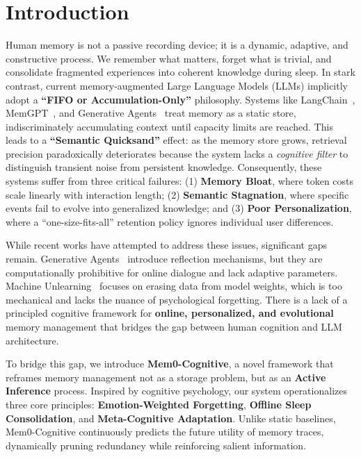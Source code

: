 \section{Introduction}
\label{sec:introduction}

Human memory is not a passive recording device; it is a dynamic, adaptive, and constructive process. We remember what matters, forget what is trivial, and consolidate fragmented experiences into coherent knowledge during sleep. In stark contrast, current memory-augmented Large Language Models (LLMs) implicitly adopt a \textbf{``FIFO or Accumulation-Only''} philosophy. Systems like LangChain~\cite{langchain}, MemGPT~\cite{memgpt}, and Generative Agents~\cite{generative_agents} treat memory as a static store, indiscriminately accumulating context until capacity limits are reached. This leads to a \textbf{``Semantic Quicksand''} effect: as the memory store grows, retrieval precision paradoxically deteriorates because the system lacks a \textit{cognitive filter} to distinguish transient noise from persistent knowledge. Consequently, these systems suffer from three critical failures: (1) \textbf{Memory Bloat}, where token costs scale linearly with interaction length; (2) \textbf{Semantic Stagnation}, where specific events fail to evolve into generalized knowledge; and (3) \textbf{Poor Personalization}, where a ``one-size-fits-all'' retention policy ignores individual user differences.

While recent works have attempted to address these issues, significant gaps remain. Generative Agents~\cite{generative_agents} introduce reflection mechanisms, but they are computationally prohibitive for online dialogue and lack adaptive parameters. Machine Unlearning~\cite{sekhar2021unlearning} focuses on erasing data from model weights, which is too mechanical and lacks the nuance of psychological forgetting. There is a lack of a principled cognitive framework for \textbf{online, personalized, and evolutional} memory management that bridges the gap between human cognition and LLM architecture.

To bridge this gap, we introduce \textbf{Mem0-Cognitive}, a novel framework that reframes memory management not as a storage problem, but as an \textbf{Active Inference} process. Inspired by cognitive psychology, our system operationalizes three core principles: \textbf{Emotion-Weighted Forgetting}, \textbf{Offline Sleep Consolidation}, and \textbf{Meta-Cognitive Adaptation}. Unlike static baselines, Mem0-Cognitive continuously predicts the future utility of memory traces, dynamically pruning redundancy while reinforcing salient information.

